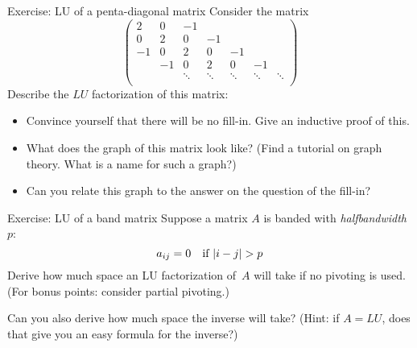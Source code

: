 
\begin{frame}{Exercise: LU of a penta-diagonal matrix}
  Consider the matrix
  \[
  \begin{pmatrix}
    2&0&-1\\
    0&2&0&-1\\
    -1&0&2&0&-1\\
    &-1&0&2&0&-1\\
    &&\ddots&\ddots&\ddots&\ddots&\ddots\\
  \end{pmatrix}
  \]
  Describe the $LU$ factorization of this matrix:
  \begin{itemize}
  \item Convince yourself that there will be no fill-in. Give an inductive proof of this.
  \item What does the graph of this matrix look like?
    (Find a tutorial on graph theory. What is a name for such a graph?)
  \item Can you relate this graph to the answer on the question of the fill-in?
  \end{itemize}
\end{frame}

\begin{frame}{Exercise: LU of a band matrix}
  Suppose a matrix $A$ is banded with \emph{halfbandwidth}~$p$:
  \[ a_{ij}=0\quad\hbox{if $|i-j|>p$} \]
  Derive how much space an LU factorization of~$A$ will take if no
  pivoting is used. (For bonus points: consider partial pivoting.)

  Can you also derive how much space the inverse will take? (Hint: if
  $A=LU$, does that give you an easy formula for the inverse?)
\end{frame}

\endinput 


\frame{\frametitle{Graph theory of sparse matrices}
  Some things (reducibility) are easiest seen in a graph
  
  \texttt{[image: matrix-graph]}
}

